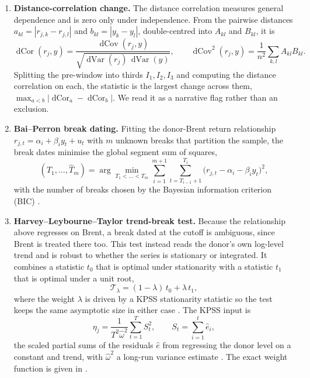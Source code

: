 \begin{enumerate}
\item \textbf{Distance-correlation change.} The distance correlation \citep{szekely2007} measures
general dependence and is zero only under independence. From the pairwise distances
$a_{kl}=|r_{j,k}-r_{j,l}|$ and $b_{kl}=|y_k-y_l|$, double-centred into $A_{kl}$ and $B_{kl}$, it is
\begin{equation}
\operatorname{dCor}(r_j,y)=\frac{\operatorname{dCov}(r_j,y)}{\sqrt{\operatorname{dVar}(r_j)\,\operatorname{dVar}(y)}},
\qquad
\operatorname{dCov}^2(r_j,y)=\frac{1}{n^2}\sum_{k,l}A_{kl}B_{kl}.
\label{eq:dcor}
\end{equation}
Splitting the pre-window into thirds $I_1,I_2,I_3$ and computing the distance correlation on each,
the statistic is the largest change across them, $\max_{a<b}|\operatorname{dCor}_a-\operatorname{dCor}_b|$.
We read it as a narrative flag rather than an exclusion.

\item \textbf{Bai--Perron break dating.} Fitting the donor-Brent return relationship
$r_{j,t}=\alpha_i+\beta_i y_t+u_t$ with $m$ unknown breaks that partition the sample, the break
dates minimise the global segment sum of squares,
\begin{equation}
(\hat T_1,\dots,\hat T_m)=\arg\min_{T_1<\dots<T_m}\sum_{i=1}^{m+1}\sum_{t=T_{i-1}+1}^{T_i}
\big(r_{j,t}-\alpha_i-\beta_i y_t\big)^2,
\label{eq:baiperron}
\end{equation}
with the number of breaks chosen by the Bayesian information criterion (BIC) \citep{baiperron1998,baiperron2003}.

\item \textbf{Harvey--Leybourne--Taylor trend-break test.} Because the relationship above
regresses on Brent, a break dated at the cutoff is ambiguous, since Brent is treated there too.
This test instead reads the donor's own log-level trend and is robust to whether the series is
stationary or integrated. It combines a statistic $t_0$ that is optimal under stationarity with a
statistic $t_1$ that is optimal under a unit root,
\begin{equation}
\mathcal{T}_\lambda=(1-\lambda)\,t_0+\lambda\,t_1,
\label{eq:hlt}
\end{equation}
where the weight $\lambda$ is driven by a KPSS stationarity statistic so the test keeps the same
asymptotic size in either case \citep{harvey2009}. The KPSS input is
\begin{equation}
\eta_j=\frac{1}{T^2\hat\omega^2}\sum_{t=1}^{T}S_t^2,\qquad S_t=\sum_{i=1}^{t}\hat e_i,
\label{eq:kpss}
\end{equation}
the scaled partial sums of the residuals $\hat e$ from regressing the donor level on a constant
and trend, with $\hat\omega^2$ a long-run variance estimate \citep{kpss1992}. The exact weight
function is given in \citet{harvey2009}.
\end{enumerate}

